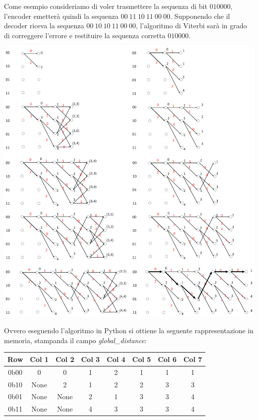 Come esempio consideriamo di voler trasmettere la sequenza di bit $010000$, l'encoder emetterà quindi la sequenza $00 \ 11 \ 10 \ 11 \ 00 \ 00$. Supponendo che il decoder riceva la sequenza $00 \ 10 \ 10 \ 11 \ 00 \ 00$, l'algoritmo di Viterbi sarà in grado di correggere l'errore e restituire la sequenza corretta $010000$.




\begin{center}
    \includegraphics[width=1\textwidth]{imgs/viterbi_example.png}
\end{center}


Ovvero eseguendo l'algoritmo in Python si ottiene la seguente rappresentazione in memoria, stampanda il campo \textit{global\_distance}:

\begin{table}[h!]
\centering
\begin{tabular}{|c|c|c|c|c|c|c|c|}
\hline
\textbf{Row} & \textbf{Col 1} & \textbf{Col 2} & \textbf{Col 3} & \textbf{Col 4} & \textbf{Col 5} & \textbf{Col 6} & \textbf{Col 7} \\ \hline
0b00         & 0              & 0              & 1              & 2              & 1              & 1              & 1              \\ \hline
0b10         & None           & 2              & 1              & 2              & 2              & 3              & 3              \\ \hline
0b01         & None           & None           & 2              & 1              & 3              & 3              & 4              \\ \hline
0b11         & None           & None           & 4              & 3              & 3              & 3              & 4              \\ \hline
\end{tabular}
\end{table}


